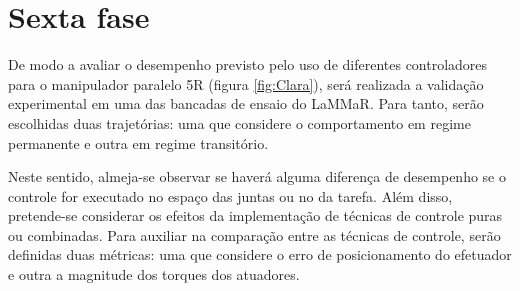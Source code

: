 \documentclass[]{politex}
\begin{document}
\section{Sexta fase} 
De modo a avaliar o desempenho previsto pelo uso de diferentes controladores para o manipulador paralelo 5R (figura \ref{fig:Clara}), será realizada a validação experimental em uma das bancadas de ensaio do LaMMaR. Para tanto, serão escolhidas duas trajetórias: uma que considere o comportamento em regime permanente e outra em regime transitório. 

Neste sentido, almeja-se observar se haverá alguma diferença de desempenho se o controle for executado no espaço das juntas ou no da tarefa. Além disso, pretende-se considerar os efeitos da implementação de técnicas de controle puras ou combinadas. Para auxiliar na comparação entre as técnicas de controle, serão definidas duas métricas: uma que considere o erro de posicionamento do efetuador e outra a magnitude dos torques dos atuadores.



\end{document}

